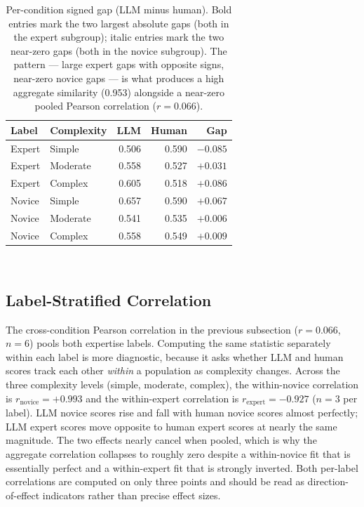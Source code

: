 \documentclass{sigchi-ext}
\begin{document}
\begin{table}[h]
  \centering
  \begin{tabular}{l l r r r}
    \toprule
    \textbf{Label} & \textbf{Complexity} & \textbf{LLM} & \textbf{Human} & \textbf{Gap} \\
    \midrule
    Expert & Simple   & 0.506 & 0.590 & \textbf{$-0.085$} \\
    Expert & Moderate & 0.558 & 0.527 & $+0.031$ \\
    Expert & Complex  & 0.605 & 0.518 & \textbf{$+0.086$} \\
    Novice & Simple   & 0.657 & 0.590 & $+0.067$ \\
    Novice & Moderate & 0.541 & 0.535 & \emph{$+0.006$} \\
    Novice & Complex  & 0.558 & 0.549 & \emph{$+0.009$} \\
    \bottomrule
  \end{tabular}
  \caption{Per-condition signed gap (LLM minus human). Bold entries mark the two largest absolute gaps (both in the expert subgroup); italic entries mark the two near-zero gaps (both in the novice subgroup). The pattern --- large expert gaps with opposite signs, near-zero novice gaps --- is what produces a high aggregate similarity (0.953) alongside a near-zero pooled Pearson correlation ($r = 0.066$).}~\label{tab:gap}
\end{table}

\subsection{Label-Stratified Correlation}
The cross-condition Pearson correlation in the previous subsection ($r = 0.066$, $n = 6$) pools both expertise labels. Computing the same statistic separately within each label is more diagnostic, because it asks whether LLM and human scores track each other \emph{within} a population as complexity changes. Across the three complexity levels (simple, moderate, complex), the within-novice correlation is $r_{\text{novice}} = +0.993$ and the within-expert correlation is $r_{\text{expert}} = -0.927$ ($n = 3$ per label). LLM novice scores rise and fall with human novice scores almost perfectly; LLM expert scores move opposite to human expert scores at nearly the same magnitude. The two effects nearly cancel when pooled, which is why the aggregate correlation collapses to roughly zero despite a within-novice fit that is essentially perfect and a within-expert fit that is strongly inverted. Both per-label correlations are computed on only three points and should be read as direction-of-effect indicators rather than precise effect sizes.
\end{document}
